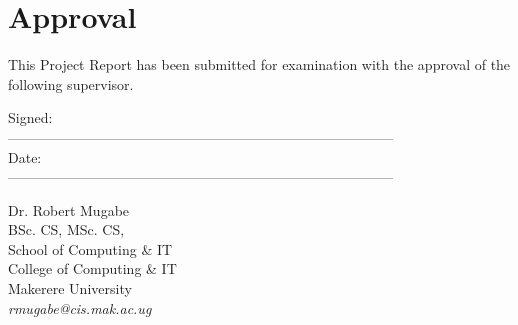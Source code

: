 \cleardoublepage
{}
\chapter*{Approval}
This Project Report has been submitted for examination with the approval of the following supervisor.

\vspace{1.0em}
\noindent
Signed: \\
-----------------------------------------------------------------------------------\\
Date: \\
-----------------------------------------------------------------------------------\\

\vspace{2.0em}

\noindent
Dr. Robert Mugabe \\
BSc. CS, MSc. CS,\\
School of Computing \& IT\\
College of Computing \& IT\\
Makerere University\\
\emph{rmugabe@cis.mak.ac.ug}
\newpage
